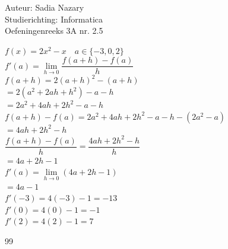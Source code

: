 \documentclass[a4paper]{article}
\begin{document}
  
\noindent \large Auteur: Sadia Nazary  \\
\noindent \large Studierichting: Informatica\\
\noindent \large Oefeningenreeks 3A nr. 2.5\\

\medskip

\normalsize

$f(x)=2x^2-x \quad a \in \{-3,0,2\}$ \\



$f'(a)=\lim\limits_{h\to 0} \dfrac{f(a+h)-f(a)}{h}$ \\



$f(a+h)=2(a+h)^2-(a+h)$ \\



$=2(a^2+2ah+h^2)-a-h$ \\



$=2a^2+4ah+2h^2-a-h$ \\



$f(a+h)-f(a)=2a^2+4ah+2h^2-a-h-(2a^2-a)$ \\



$=4ah+2h^2-h$ \\



$\dfrac{f(a+h)-f(a)}{h}=\dfrac{4ah+2h^2-h}{h}$ \\



$=4a+2h-1$ \\



$f'(a)=\lim\limits_{h\to 0}(4a+2h-1)$ \\



$=4a-1$ \\


$f'(-3)=4(-3)-1=-13$ \\



$f'(0)=4(0)-1=-1$ \\



$f'(2)=4(2)-1=7$ \\

\begin{thebibliography}{99}
\end{thebibliography}
\end{document}
